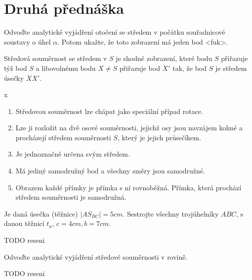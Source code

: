\documentclass[../main.tex]{subfiles}
\begin{document}
    \section{Druhá přednáška}

    \begin{example}
        Odvoďte analytické vyjádření otočení se středem v počátku souřadnicové soustavy
        o úhel $\alpha$. Potom ukažte, že toto zobrazení má jeden bod <fuk>.
    \end{example}

    \begin{definition}
        Středová souměrnost se středem v $S$ je shodné zobrazení, které
        bodu $S$ přiřazuje týž bod $S$ a libovolnému bodu $X \neq S$ přiřazuje
        bod $X'$ tak, že bod $S$ je středem úsečky $XX'$.
    \end{definition}

    \begin{remark} {\color{white} x}
        \begin{enumerate}
            \item Středovou souměrnost lze chápat jako speciální případ rotace.
            \item Lze ji rozložit na dvě osové souměrnosti, jejichž osy jsou navzájem kolmé
            a procházejí středem souměrnosti $S$, který je jejich průsečíkem.
            \item Je jednoznačně určena svým středem.
            \item Má jediný samodružný bod a všechny směry jsou samodružné.
            \item Obrazem každé přímky je přímka s ní rovnoběžná. Přímka, která prochází
            středem souměrnosti je samodružná.
        \end{enumerate}
    \end{remark}

    \begin{example}
        Je daná úsečka (těžnice) $|AS_{BC}| = 5 cm$. Sestrojte všechny trojúhelníky $ABC$,
        s danou těžnicí $t_a$, $c = 4 cm, b = 7 cm$.

        TODO reseni
    \end{example}

    \begin{example}
        Odvoďte analytické vyjádření středové souměrnosti v rovině.

        TODO reseni
    \end{example}
\end{document}
